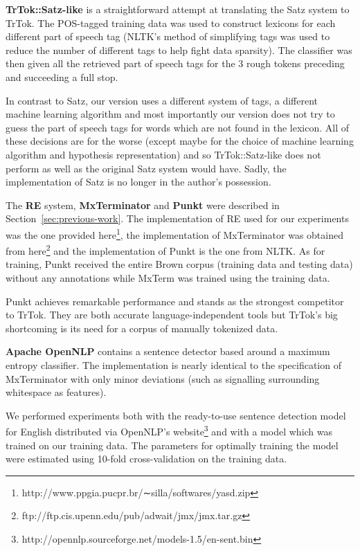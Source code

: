 \textbf{TrTok::Satz-like} is a straightforward attempt at translating
the Satz system to TrTok. The POS-tagged training data was used to
construct lexicons for each different part of speech tag (NLTK's
method of simplifying tags was used to reduce the number of different
tags to help fight data sparsity). The classifier was then given all
the retrieved part of speech tags for the 3 rough tokens preceding and
succeeding a full stop.

In contrast to Satz, our version uses a different system of tags, a
different machine learning algorithm and most importantly our version
does not try to guess the part of speech tags for words which are not
found in the lexicon. All of these decisions are for the worse (except
maybe for the choice of machine learning algorithm and hypothesis
representation) and so TrTok::Satz-like does not perform as well as
the original Satz system would have. Sadly, the implementation of Satz
is no longer in the author's possession.

The \textbf{RE} system, \textbf{MxTerminator} and \textbf{Punkt} were
described in Section~\ref{sec:previous-work}. The implementation of RE
used for our experiments was the one provided
here\footnote{http://www.ppgia.pucpr.br/∼silla/softwares/yasd.zip},
the implementation of MxTerminator was obtained from
here\footnote{ftp://ftp.cis.upenn.edu/pub/adwait/jmx/jmx.tar.gz} and
the implementation of Punkt is the one from NLTK. As for training,
Punkt received the entire Brown corpus (training data and testing
data) without any annotations while MxTerm was trained using the
training data.

Punkt achieves remarkable performance and stands as the strongest
competitor to TrTok. They are both accurate language-independent tools
but TrTok's big shortcoming is its need for a corpus of manually
tokenized data.

\textbf{Apache OpenNLP} contains a sentence detector based around a
maximum entropy classifier. The implementation is nearly identical to
the specification of MxTerminator with only minor deviations (such as
signalling surrounding whitespace as features).

We performed experiments both with the ready-to-use sentence detection
model for English distributed via OpenNLP's
website\footnote{http://opennlp.sourceforge.net/models-1.5/en-sent.bin}
and with a model which was trained on our training data. The
parameters for optimally training the model were estimated using
10-fold cross-validation on the training data.

